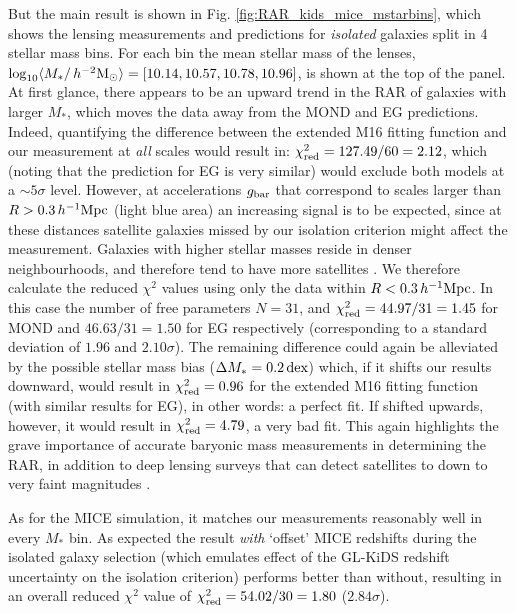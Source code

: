 \documentclass[usenatbib]{mnras}
\newcommand{\hmsun}{\,h^{-2} {\rm M_\odot}}
\newcommand{\hMpc}{\, h^{-1}{\rm{Mpc}} }
\newcommand{\lan}{\langle}
\newcommand{\ran}{\rangle}
\newcommand{\un}[1]{_{\rm #1}}
\newcommand{\dex}{\, {\rm dex}}
\begin{document}
But the main result is shown in Fig. \ref{fig:RAR_kids_mice_mstarbins}, which shows the lensing measurements and predictions for \emph{isolated} galaxies split in 4 stellar mass bins. For each bin the mean stellar mass of the lenses, $\log_{10}\lan M_*/\hmsun \ran = [10.14, 10.57, 10.78, 10.96]$, is shown at the top of the panel. At first glance, there appears to be an upward trend in the RAR of galaxies with larger $M_*$, which moves the data away from the MOND and EG predictions. Indeed, quantifying the difference between the extended M16 fitting function and our measurement at \emph{all} scales would result in: $\chi\un{red}^2 = 127.49 / 60 = 2.12$, which (noting that the prediction for EG is very similar) would exclude both models at a $\sim5 \sigma$ level. However, at accelerations $g\un{bar}$ that correspond to scales larger than $R > 0.3 \hMpc$ (light blue area) an increasing signal is to be expected, since at these distances satellite galaxies missed by our isolation criterion might affect the measurement. Galaxies with higher stellar masses reside in denser neighbourhoods, and therefore tend to have more satellites \cite[see e.g.]{baldry2006, bolzonella2010, brouwer2016}. We therefore calculate the reduced $\chi^2$ values using only the data within $R < 0.3 \hMpc$. In this case the number of free parameters $N = 31$, and $\chi\un{red}^2 = 44.97 / 31 = 1.45$ for MOND and $46.63 / 31 = 1.50$ for EG respectively (corresponding to a standard deviation of $1.96$ and $2.10\sigma$). The remaining difference could again be alleviated by the possible stellar mass bias ($\Delta M_* = 0.2 \dex$) which, if it shifts our results downward, would result in $\chi\un{red}^2 = 0.96$ for the extended M16 fitting function (with similar results for EG), in other words: a perfect fit. If shifted upwards, however, it would result in $\chi\un{red}^2=4.79$, a very bad fit. This again highlights the grave importance of accurate baryonic mass measurements in determining the RAR, in addition to deep lensing surveys that can detect satellites to down to very faint magnitudes \cite[such as the future Euclid survey;][]{laureijs2011}.

As for the MICE simulation, it matches our measurements reasonably well in every $M_*$ bin. As expected the result \emph{with} `offset' MICE redshifts during the isolated galaxy selection (which emulates effect of the GL-KiDS redshift uncertainty on the isolation criterion) performs better than without, resulting in an overall reduced $\chi^2$ value of $\chi\un{red}^2 = 54.02 / 30 = 1.80$ ($2.84 \sigma$).
\end{document}
